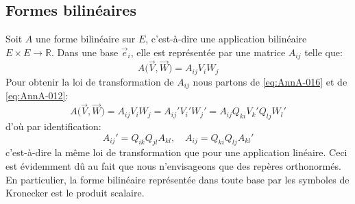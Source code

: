 \subsection{Formes bilinéaires}
Soit $A$ une forme bilinéaire sur $E$, c'est-à-dire une application bilinéaire $E\times E \rightarrow \mathbb{R}$.
Dans une base $\vec{e}_i$, elle est représentée par une matrice $A_{ij}$ telle que:
\begin{equation}
    A \bigl( \vec{V}, \vec{W} \bigr) = A_{ij} V_i W_j
    \label{eq:AnnA-016}
\end{equation}
Pour obtenir la loi de transformation de $A_{ij}$ nous partons de \eqref{eq:AnnA-016} et de \eqref{eq:AnnA-012}:
\begin{equation}
    A\bigl( \vec{V}, \vec{W} \bigr) = A_{ij} V_i W_j = A_{ij}' V_i'W_j'
    = A_{ij} Q_{ki} V_k' Q_{lj} W_l'
    \label{eq:AnnA-017}
\end{equation}
d'où par identification:
\begin{equation}
    A_{ij}' = Q_{ik} Q_{jl} A_{kl}, \quad A_{ij} = Q_{ki} Q_{lj} A_{kl}'
    \label{eq:AnnA-018}
\end{equation}
c'est-à-dire la même loi de transformation que pour une application linéaire.
Ceci est évidemment dû au fait que nous n'envisageons que des repères orthonormés.
En particulier, la forme bilinéaire représentée dans toute base par les symboles de Kronecker est le produit scalaire.
